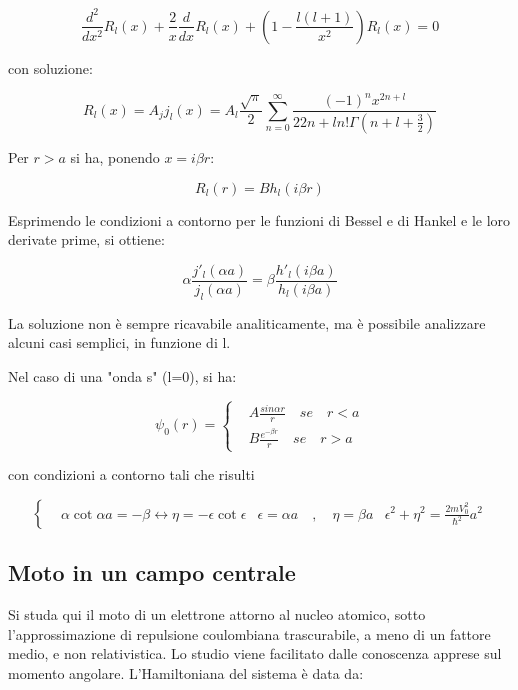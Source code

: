 \documentclass{article}
\begin{document}
\begin{equation}
    \frac{d^2}{dx^2}R_l(x)+\frac{2}{x}\frac{d}{dx}R_l(x)+\left(1-\frac{l(l+1)}{x^2}\right)R_l(x)=0
\end{equation}

con soluzione:

\begin{equation}
    R_l(x)=A_j j_l(x)=A_l \frac{\sqrt{\pi}}{2}\sum_{n=0}^{\infty}\frac{(-1)^nx^{2n+l}}{2{2n+l}n!\Gamma(n+l+\frac{3}{2})}
\end{equation}

Per $r>a$ si ha, ponendo $x=i\beta r$:

\begin{equation}
    R_l(r)=Bh_l(i\beta r)
\end{equation}

Esprimendo le condizioni a contorno per le funzioni di Bessel e di Hankel e le loro derivate prime, si ottiene:

\begin{equation}
    \alpha \frac{j'_l(\alpha a)}{j_l(\alpha a)}=\beta \frac{h'_l(i\beta a)}{h_l(i\beta a)}
\end{equation}

La soluzione non è sempre ricavabile analiticamente, ma è possibile analizzare alcuni casi semplici, in funzione di l.

Nel caso di una "onda s" (l=0), si ha:

\begin{equation}
    \psi_0(r)=
    \left\{
    \begin{aligned}
         & A\frac{sin{\alpha r}}{r} \quad se \quad r<a \\
         & B\frac{e^{-\beta r}}{r} \quad se \quad r>a
    \end{aligned}
    \right.
\end{equation}

con condizioni a contorno tali che risulti

\begin{equation}
    \left\{
    \begin{aligned}
         & \alpha \cot{\alpha a}=-\beta \leftrightarrow \eta=-\epsilon \cot{\epsilon}
         & \epsilon=\alpha a \quad , \quad \eta=\beta a
         & \epsilon^2+\eta^2=\frac{2mV_0^2}{\hbar^2}a^2
    \end{aligned}
    \right.
\end{equation}

\subsection{Moto in un campo centrale}
Si studa qui il moto di un elettrone attorno al nucleo atomico, sotto l'approssimazione di repulsione coulombiana trascurabile, a meno di un fattore medio, e non relativistica.
Lo studio viene facilitato dalle conoscenza apprese sul momento angolare.
L'Hamiltoniana del sistema è data da:
\end{document}
